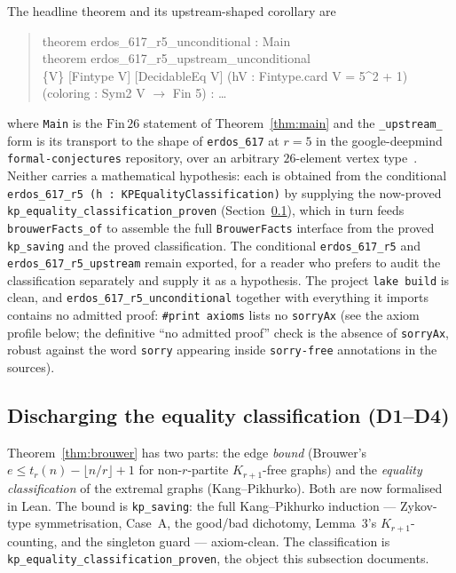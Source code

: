 \documentclass[11pt,reqno]{amsart}
\theoremstyle{definition}
\theoremstyle{remark}
\begin{document}
The headline theorem and its upstream-shaped corollary are
\begin{quote}\ttfamily\small
theorem erdos\_617\_r5\_unconditional : Main\\
theorem erdos\_617\_r5\_upstream\_unconditional\\
\phantom{xx}\{V\} [Fintype V] [DecidableEq V] (hV : Fintype.card V = 5\textasciicircum2 + 1)\\
\phantom{xx}(coloring : Sym2 V $\to$ Fin 5) : \ldots
\end{quote}
where \texttt{Main} is the $\mathrm{Fin}\,26$ statement of Theorem~\ref{thm:main}
and the \texttt{\_upstream\_} form is its transport to the shape of
\texttt{erdos\_617} at $r=5$ in the google-deepmind \texttt{formal-conjectures}
repository, over an arbitrary $26$-element vertex type~\cite{FC}. Neither carries a
mathematical hypothesis: each is obtained from the conditional
\texttt{erdos\_617\_r5 (h : KPEqualityClassification)} by supplying the now-proved
\texttt{kp\_equality\_classification\_proven} (Section~\ref{ssec:lean-brouwer}), which
in turn feeds \texttt{brouwerFacts\_of} to assemble the full \texttt{BrouwerFacts}
interface from the proved \texttt{kp\_saving} and the proved classification. The
conditional \texttt{erdos\_617\_r5} and \texttt{erdos\_617\_r5\_upstream} remain
exported, for a reader who prefers to audit the classification separately and supply it
as a hypothesis. The project \texttt{lake build} is clean, and
\texttt{erdos\_617\_r5\_unconditional} together with everything it imports contains no
admitted proof: \texttt{\#print axioms} lists no \texttt{sorryAx} (see the axiom profile
below; the definitive ``no admitted proof'' check is the absence of \texttt{sorryAx},
robust against the word \texttt{sorry} appearing inside \texttt{sorry-free} annotations
in the sources).

\subsection{Discharging the equality classification (D1--D4)}\label{ssec:lean-brouwer}
Theorem~\ref{thm:brouwer} has two parts: the edge \emph{bound} (Brouwer's
$e\le t_r(n)-\lfloor n/r\rfloor+1$ for non-$r$-partite $K_{r+1}$-free graphs) and the
\emph{equality classification} of the extremal graphs (Kang--Pikhurko). Both are now
formalised in Lean. The bound is \texttt{kp\_saving}: the full Kang--Pikhurko induction
--- Zykov-type symmetrisation, Case~A, the good/bad dichotomy, Lemma~3's
$K_{r+1}$-counting, and the singleton guard --- axiom-clean. The classification is
\texttt{kp\_equality\_classification\_proven}, the object this subsection documents.
\end{document}
